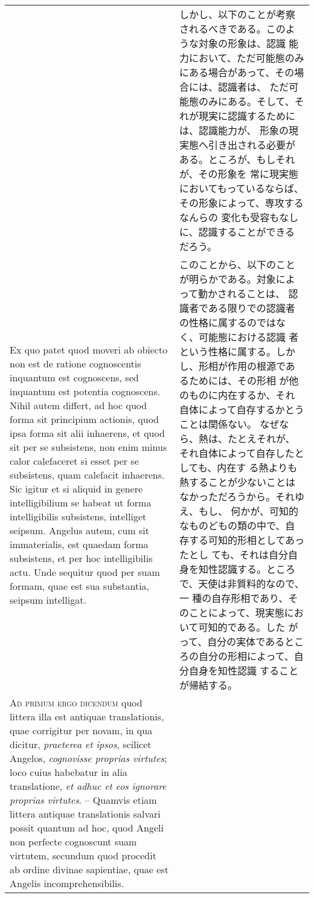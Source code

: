 \documentclass[10pt]{jsarticle} %
\begin{document}
\begin{longtable}{p{21em}p{21em}}
&

しかし、以下のことが考察されるべきである。このような対象の形象は、認識
能力において、ただ可能態のみにある場合があって、その場合には、認識者は、
ただ可能態のみにある。そして、それが現実に認識するためには、認識能力が、
形象の現実態へ引き出される必要がある。ところが、もしそれが、その形象を
常に現実態においてもっているならば、その形象によって、専攻するなんらの
変化も受容もなしに、認識することができるだろう。


\\

Ex quo patet quod moveri ab obiecto non est de ratione cognoscentis
inquantum est cognoscens, sed inquantum est potentia cognoscens. Nihil
autem differt, ad hoc quod forma sit principium actionis, quod ipsa
forma sit alii inhaerens, et quod sit per se subsistens, non enim
minus calor calefaceret si esset per se subsistens, quam calefacit
inhaerens. Sic igitur et si aliquid in genere intelligibilium se
habeat ut forma intelligibilis subsistens, intelliget seipsum. Angelus
autem, cum sit immaterialis, est quaedam forma subsistens, et per hoc
intelligibilis actu. Unde sequitur quod per suam formam, quae est sua
substantia, seipsum intelligat.


&

このことから、以下のことが明らかである。対象によって動かされることは、
認識者である限りでの認識者の性格に属するのではなく、可能態における認識
者という性格に属する。しかし、形相が作用の根源であるためには、その形相
が他のものに内在するか、それ自体によって自存するかとうことは関係ない。
なぜなら、熱は、たとえそれが、それ自体によって自存したとしても、内在す
る熱よりも熱することが少ないことはなかっただろうから。それゆえ、もし、
何かが、可知的なものどもの類の中で、自存する可知的形相としてあったとし
ても、それは自分自身を知性認識する。ところで、天使は非質料的なので、一
種の自存形相であり、そのことによって、現実態において可知的である。した
がって、自分の実体であるところの自分の形相によって、自分自身を知性認識
することが帰結する。

\\


{\scshape Ad primum ergo dicendum} quod littera illa est antiquae
translationis, quae corrigitur per novam, in qua dicitur, {\itshape
praeterea et ipsos}, scilicet Angelos, {\itshape cognovisse proprias
virtutes}; loco cuius habebatur in alia translatione, {\itshape et
adhuc et eos ignorare proprias virtutes}. -- Quamvis etiam littera
antiquae translationis salvari possit quantum ad hoc, quod Angeli non
perfecte cognoscunt suam virtutem, secundum quod procedit ab ordine
divinae sapientiae, quae est Angelis incomprehensibilis.



\end{longtable}
\end{document}
